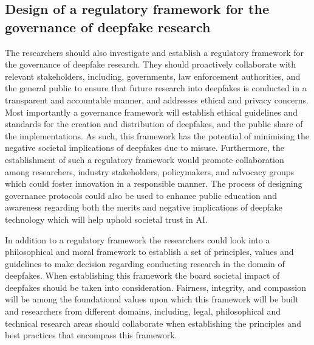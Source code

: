 \subsection{Design of a regulatory framework for the governance of deepfake research}
The researchers should also investigate and establish a regulatory framework for the governance of deepfake research. They should proactively collaborate with relevant stakeholders, including, governments, law enforcement authorities, and the general public to ensure that future research into deepfakes is conducted in a transparent and accountable manner, and addresses ethical and privacy concerns. Most importantly a governance framework will establish ethical guidelines and standards for the creation and distribution of deepfakes, and the public share of the implementations. As such, this framework has the potential of minimising the negative societal implications of deepfakes due to misuse. Furthermore, the establishment of such a regulatory framework would promote collaboration among researchers, industry stakeholders, policymakers, and advocacy groups which could foster innovation in a responsible manner. The process of designing governance protocols could also be used to enhance public education and awareness regarding both the merits and negative implications of deepfake technology which will help uphold societal trust in AI. 

In addition to a regulatory framework the researchers could look into a philosophical and moral framework to establish a set of principles, values and guidelines to make decision regarding conducting research in the domain of deepfakes. When establishing this framework the board societal impact of deepfakes should be taken into consideration. Fairness, integrity, and compassion will be among the foundational values upon which this framework will be built and researchers from different domains, including, legal, philosophical and technical research areas should collaborate when establishing the principles and best practices that encompass this framework. 
